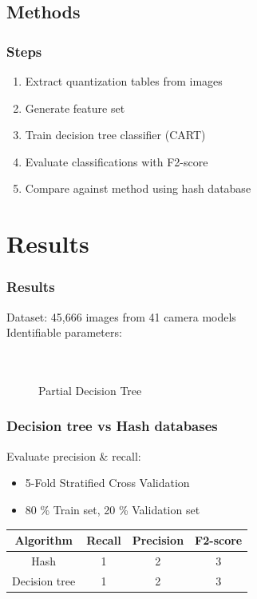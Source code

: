 \documentclass{beamer}
\begin{document}
\subsection{Methods}
\begin{frame}
\frametitle{Steps}
\begin{enumerate}
\item Extract quantization tables from images
\item Generate feature set
\item Train decision tree classifier (CART)
\item Evaluate classifications with F2-score
\item Compare against method using hash database
\end{enumerate}
\end{frame}


\section[Results]{Results}
\begin{frame}
\frametitle{Results}
Dataset: 45,666 images from 41 camera models\\
Identifiable parameters: \\
~\\~\\
\begin{figure}
   \caption{Partial Decision Tree}
\end{figure}
\end{frame}

\begin{frame}
\frametitle{Decision tree vs Hash databases}
Evaluate precision \& recall:
\begin{itemize}
\item 5-Fold Stratified Cross Validation
\item 80 \% Train set, 20 \% Validation set
\end{itemize}

\begin{table}
\begin{tabular}{| c| c| c| c|}
\hline
Algorithm & Recall & Precision & F2-score\\
\hline
Hash & 1 & 2 & 3\\
Decision tree & 1 & 2 &3 \\
\hline
\end{tabular}
\end{table}
\end{frame}
\end{document}
